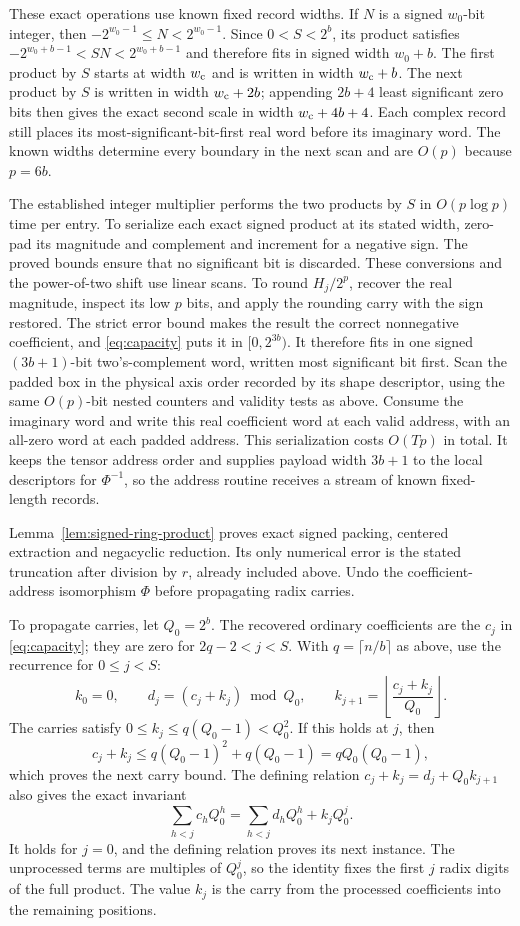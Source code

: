 These exact operations use known fixed record widths. If $N$ is a
signed $w_0$-bit integer, then $-2^{w_0-1}\leq N<2^{w_0-1}$. Since
$0<S<2^b$, its product satisfies
$-2^{w_0+b-1}<SN<2^{w_0+b-1}$ and therefore fits in signed width $w_0+b$.
The first product by $S$ starts at width $w_{\rm c}$ and is written in
width $w_{\rm c}+b$. The next product by $S$ is written in width
$w_{\rm c}+2b$; appending $2b+4$ least significant zero bits then gives
the exact second scale in width $w_{\rm c}+4b+4$. Each complex record
still places its most-significant-bit-first real word before its imaginary
word. The known widths determine every boundary in the next scan and are
$O(p)$ because $p=6b$.

The established integer multiplier performs the two products by $S$ in
$O(p\log p)$ time per entry. To serialize each exact signed product at
its stated width, zero-pad its magnitude and complement and increment
for a negative sign. The proved bounds ensure that no significant bit is
discarded. These conversions and the power-of-two shift use linear scans.
To round $H_j/2^p$, recover the real magnitude, inspect its low $p$ bits,
and apply the rounding carry with the sign restored. The strict error
bound makes the result the correct nonnegative coefficient, and
\eqref{eq:capacity} puts it in $[0,2^{3b})$. It therefore fits in one
signed $(3b+1)$-bit two's-complement word, written most significant bit
first. Scan the padded box in the
physical axis order recorded by its shape descriptor, using the same
$O(p)$-bit nested counters and validity tests as above. Consume the
imaginary word and write this real coefficient word at each valid address,
with an all-zero
word at each padded address. This serialization costs $O(Tp)$ in total.
It keeps the tensor address order and supplies payload width $3b+1$ to
the local descriptors for $\Phi^{-1}$, so the address routine receives a
stream of known fixed-length records.

Lemma~\ref{lem:signed-ring-product} proves exact signed packing,
centered extraction and negacyclic reduction. Its only numerical error
is the stated truncation after division by $r$, already included above.
Undo the coefficient-address isomorphism $\Phi$ before propagating
radix carries.

To propagate carries, let $Q_0=2^b$.  The recovered ordinary
coefficients are the $c_j$ in \eqref{eq:capacity}; they are zero for
$2q-2<j<S$.  With $q=\lceil n/b\rceil$ as
above, use the recurrence for $0\le j<S$:
\[
 k_0=0,\qquad d_j=(c_j+k_j)\bmod Q_0,\qquad
 k_{j+1}=\left\lfloor\frac{c_j+k_j}{Q_0}\right\rfloor.
\]
The carries satisfy $0\le k_j\le q(Q_0-1)<Q_0^2$.  If this holds at
$j$, then
\[
 c_j+k_j\le q(Q_0-1)^2+q(Q_0-1)=qQ_0(Q_0-1),
\]
which proves the next carry bound.  The defining relation
$c_j+k_j=d_j+Q_0k_{j+1}$ also gives the exact invariant
\[
 \sum_{h<j}c_hQ_0^h
   =\sum_{h<j}d_hQ_0^h+k_jQ_0^j.
\]
It holds for $j=0$, and the defining relation proves its next instance.
The unprocessed terms are multiples of $Q_0^j$, so the identity fixes
the first $j$ radix digits of the full product.  The value $k_j$ is
the carry from the processed coefficients into the remaining positions.

